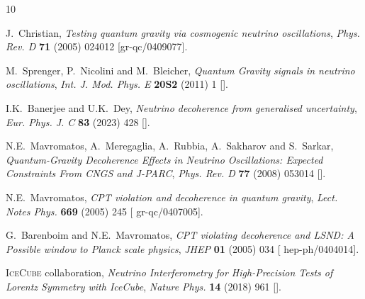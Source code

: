 \documentclass[11pt]{article}
\begin{document}
\providecommand{\href}[2]{#2}\begingroup\raggedright\begin{thebibliography}{10}

J.~Christian, \emph{{Testing quantum gravity via cosmogenic neutrino
  oscillations}}, \href{https://doi.org/10.1103/PhysRevD.71.024012}{\emph{Phys.
  Rev. D} {\bfseries 71} (2005) 024012}
  [\href{https://arxiv.org/abs/gr-qc/0409077}{{\ttfamily gr-qc/0409077}}].

M.~Sprenger, P.~Nicolini and M.~Bleicher, \emph{{Quantum Gravity signals in
  neutrino oscillations}},
  \href{https://doi.org/10.1142/S0218301311040517}{\emph{Int. J. Mod. Phys. E}
  {\bfseries 20S2} (2011) 1} [\href{https://arxiv.org/abs/1111.2341}{{}}].

I.K.~Banerjee and U.K.~Dey, \emph{{Neutrino decoherence from generalised
  uncertainty}},
  \href{https://doi.org/10.1140/epjc/s10052-023-11565-0}{\emph{Eur. Phys. J. C}
  {\bfseries 83} (2023) 428}
  [\href{https://arxiv.org/abs/2208.12062}{{}}].

N.E.~Mavromatos, A.~Meregaglia, A.~Rubbia, A.~Sakharov and S.~Sarkar,
  \emph{{Quantum-Gravity Decoherence Effects in Neutrino Oscillations: Expected
  Constraints From CNGS and J-PARC}},
  \href{https://doi.org/10.1103/PhysRevD.77.053014}{\emph{Phys. Rev. D}
  {\bfseries 77} (2008) 053014}
  [\href{https://arxiv.org/abs/0801.0872}{{}}].

N.E.~Mavromatos, \emph{{CPT violation and decoherence in quantum gravity}},
  \href{https://doi.org/10.1007/11377306_8}{\emph{Lect. Notes Phys.} {\bfseries
  669} (2005) 245} [\href{https://arxiv.org/abs/gr-qc/0407005}{{\ttfamily
  gr-qc/0407005}}].

G.~Barenboim and N.E.~Mavromatos, \emph{{CPT violating decoherence and LSND: A
  Possible window to Planck scale physics}},
  \href{https://doi.org/10.1088/1126-6708/2005/01/034}{\emph{JHEP} {\bfseries
  01} (2005) 034} [\href{https://arxiv.org/abs/hep-ph/0404014}{{\ttfamily
  hep-ph/0404014}}].

{\scshape IceCube} collaboration, \emph{{Neutrino Interferometry for
  High-Precision Tests of Lorentz Symmetry with IceCube}},
  \href{https://doi.org/10.1038/s41567-018-0172-2}{\emph{Nature Phys.}
  {\bfseries 14} (2018) 961}
  [\href{https://arxiv.org/abs/1709.03434}{{}}].


\end{thebibliography}
\end{document}
